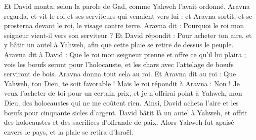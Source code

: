\begin{multicols}{2}
Et David monta, selon la parole de Gad, comme Yahweh l'avait ordonné.
Aravna regarda, et vit le roi et ses serviteurs qui venaient vers lui ; et Aravna sortit, et se prosterna devant le roi, le visage contre terre.
Aravna dit : Pourquoi le roi mon seigneur vient-il vers son serviteur ? Et David répondit : Pour acheter ton aire, et y bâtir un autel à Yahweh, afin que cette plaie se retire de dessus le peuple.
Aravna dit à David : Que le roi mon seigneur prenne et offre ce qu'il lui plaira ; vois les bœufs seront pour l'holocauste, et les chars avec l’attelage de bœufs serviront de bois.
Aravna donna tout cela au roi. Et Aravna dit au roi : Que Yahweh, ton Dieu, te soit favorable !
Mais le roi répondit à Aravna : Non ! Je veux l’acheter de toi pour un certain prix, et je n'offrirai point à Yahweh, mon Dieu, des holocaustes qui ne me coûtent rien. Ainsi, David acheta l'aire et les bœufs pour cinquante sicles d'argent.
David bâtit là un autel à Yahweh, et offrit des holocaustes et des sacrifices d’offrande de paix. Alors Yahweh fut apaisé envers le pays, et la plaie se retira d’Israël.
\PPE{}
\end{multicols}
